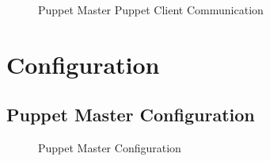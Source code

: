 \documentclass[9pt,twocolumn,twoside]{../../styles/osajnl}
\begin{document}
\begin{figure}[htbp]
\centering
{}
\caption{Puppet Master Puppet Client Communication}
\label{fig:Puppet}
\end{figure}


\section{Configuration}


\subsection {Puppet Master Configuration}

\begin{figure}[htbp]
\centering
{}
\caption{Puppet Master Configuration}
\label{fig:Puppet}
\end{figure} \cite{www-techarena}
\end{document}
